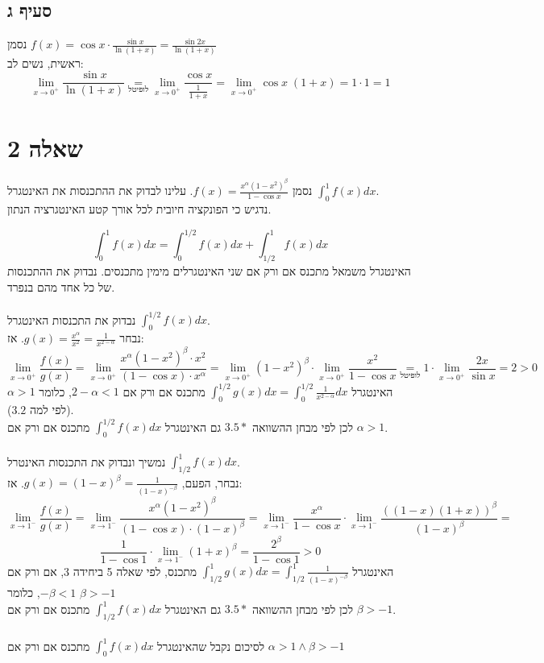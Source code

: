 \documentclass{article}
\newcommand\underrel[2]{\mathrel{\mathop{#2}\limits_{#1}}}
\begin{document}
\pagebreak

\subsection*{סעיף ג}

נסמן $f(x)=\cos x \cdot \frac{\sin x}{\ln(1+x)} = \frac{\sin 2x}{\ln(1+x)}$ \\
ראשית, נשים לב:
\[
    \lim_{x\rightarrow 0^+} \frac{\sin x}{\ln(1+x)} \underrel{\text{לופיטל}}{=}
    \lim_{x\rightarrow0^+} \frac{\cos x}{\frac{1}{1+x}} =
    \lim_{x\rightarrow0^+} \cos x\; (1+x) =
    1 \cdot 1 = 1
\]

\pagebreak

\section*{שאלה 2}

נסמן $f(x)=\frac{x^\alpha(1-x^2)^\beta}{1-\cos x}$.
עלינו לבדוק את ההתכנסות את האינטגרל $\int_0^1f(x)dx$. \\
נדגיש כי הפונקציה חיובית לכל אורך קטע האינטגרציה הנתון.

\[
    \int_0^1 f(x) dx = \int_0^{1/2}f(x)dx + \int_{1/2}^1f(x)dx
\]
האינטגרל משמאל מתכנס אם ורק אם שני האינטגרלים מימין מתכנסים. נבדוק את ההתכנסות של כל אחד מהם בנפרד.
\\\\
נבדוק את התכנסות האינטגרל $\int_0^{1/2}f(x)dx$. \\
נבחר $g(x) = \frac{x^\alpha}{x^2}=\frac{1}{x^{2-\alpha}}$. אז:
\[
    \lim_{x\rightarrow 0^+}\frac{f(x)}{g(x)} =
    \lim_{x\rightarrow 0^+}\frac{x^\alpha(1-x^2)^\beta \cdot x^2}{(1-\cos x)\cdot x^\alpha} =
    \lim_{x\rightarrow 0^+} (1-x^2)^\beta \cdot \lim_{x\rightarrow 0^+} \frac{x^2}{1-\cos x} \underrel{\text{לופיטל}}{=}
    1 \cdot \lim_{x\rightarrow 0^+} \frac{2x}{\sin x} = 2 > 0
\]
האינטגרל $\int_0^{1/2}g(x)dx=\int_0^{1/2}\frac{1}{x^{2-\alpha}}dx$
מתכנס אם ורק אם $2-\alpha < 1$,
כלומר $\alpha > 1$
(לפי למה $3.2$). \\
לכן לפי מבחן ההשוואה $3.5*$
גם האינטגרל $\int_0^{1/2}f(x)dx$
מתכנס אם ורק אם $\alpha > 1$.
\\\\
נמשיך ונבדוק את התכנסות האינטרל $\int_{1/2}^1f(x)dx$. \\
נבחר, הפעם, $g(x)=(1-x)^\beta=\frac{1}{(1-x)^{-\beta}}$. אז:
\[
    \lim_{x\rightarrow 1^-} \frac{f(x)}{g(x)} =
    \lim_{x\rightarrow 1^-} \frac{x^\alpha (1-x^2)^\beta}{(1-\cos x)\cdot (1-x)^\beta} =
    \lim_{x\rightarrow 1^-} \frac{x^\alpha}{1-\cos x} \cdot \lim_{x\rightarrow 1^-} \frac{((1-x)(1+x))^\beta}{(1-x)^\beta} =
\]
\[
    \frac{1}{1-\cos 1} \cdot \lim_{x\rightarrow 1^-} (1+x)^\beta =
    \frac{2^\beta}{1-\cos 1} > 0
\]
האינטגרל $\int_{1/2}^1g(x)dx = \int_{1/2}^1\frac{1}{(1-x)^{-\beta}}$
מתכנס, לפי שאלה 5 ביחידה 3, אם ורק אם $-\beta < 1$, כלומר $\beta > -1$ \\
לכן לפי מבחן ההשוואה $3.5*$
גם האינטגרל $\int_{1/2}^1f(x)dx$
מתכנס אם ורק אם $\beta > -1$.
\\\\
לסיכום נקבל שהאינטגרל $\int_0^1f(x)dx$
מתכנס אם ורק אם $\alpha > 1\wedge \beta > -1$
\end{document}
